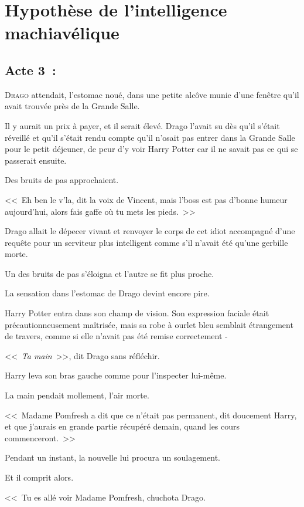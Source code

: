 \chapter{Hypothèse de l'intelligence machiavélique}

\section{Acte 3~:}

\lettrine{D}{rago} attendait, l'estomac noué, dans une petite alcôve munie d'une fenêtre qu'il avait trouvée près de la Grande Salle.

Il y aurait un prix à payer, et il serait élevé. Drago l'avait su dès qu'il s'était réveillé et qu'il s'était rendu compte qu'il n'osait pas entrer dans la Grande Salle pour le petit déjeuner, de peur d'y voir Harry Potter car il ne savait pas ce qui se passerait ensuite.

Des bruits de pas approchaient.

<<~Eh ben le v'la, dit la voix de Vincent, mais l'boss est pas d'bonne humeur aujourd'hui, alors fais gaffe où tu mets les pieds.~>>

Drago allait le dépecer vivant et renvoyer le corps de cet idiot accompagné d'une requête pour un serviteur plus intelligent comme s'il n'avait été qu'une gerbille morte.

Un des bruits de pas s'éloigna et l'autre se fit plus proche.

La sensation dans l'estomac de Drago devint encore pire.

Harry Potter entra dans son champ de vision. Son expression faciale était précautionneusement maîtrisée, mais sa robe à ourlet bleu semblait étrangement de travers, comme si elle n'avait pas été remise correctement -

<<~\emph{Ta main}~>>, dit Drago sans réfléchir.

Harry leva son bras gauche comme pour l'inspecter lui-même.

La main pendait mollement, l'air morte.

<<~Madame Pomfresh a dit que ce n'était pas permanent, dit doucement Harry, et que j'aurais en grande partie récupéré demain, quand les cours commenceront.~>>

Pendant un instant, la nouvelle lui procura un soulagement.

Et il comprit alors.

<<~Tu es allé voir Madame Pomfresh, chuchota Drago.

